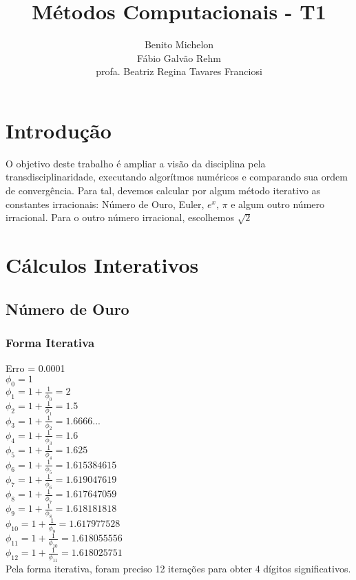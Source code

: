 \documentclass[11pt]{article}
\author{
	Benito Michelon \\
	Fábio Galvão Rehm \\
	profa. Beatriz Regina Tavares Franciosi \\
}
\title {Métodos Computacionais - T1}
\begin{document}
\maketitle
\newpage

\section{Introdução}
O objetivo deste trabalho é ampliar a visão da disciplina pela transdisciplinaridade, executando algorítmos numéricos e comparando sua
ordem de convergência. Para tal, devemos calcular por algum método iterativo as constantes irracionais: Número de Ouro, Euler, $e^x$, $\pi$ e algum outro número irracional. Para o outro número irracional, escolhemos $\sqrt{2}$
\section{Cálculos Interativos}
\subsection{Número de Ouro}
\subsubsection{Forma Iterativa}
Erro = 0.0001 \\
$\phi_{0} = 1$ \\
$\phi_{1} = 1 + \frac{1}{\phi_{0}} = 2$ \\
$\phi_{2} = 1 + \frac{1}{\phi_{1}} = 1.5$ \\
$\phi_{3} = 1 + \frac{1}{\phi_{2}} = 1.6666...$ \\
$\phi_{4} = 1 + \frac{1}{\phi_{3}} = 1.6$ \\
$\phi_{5} = 1 + \frac{1}{\phi_{4}} = 1.625$ \\
$\phi_{6} = 1 + \frac{1}{\phi_{5}} = 1.615384615$ \\
$\phi_{7} = 1 + \frac{1}{\phi_{6}} = 1.619047619$ \\
$\phi_{8} = 1 + \frac{1}{\phi_{7}} = 1.617647059$ \\
$\phi_{9} = 1 + \frac{1}{\phi_{8}} = 1.618181818$ \\
$\phi_{10} = 1 + \frac{1}{\phi_{9}} = 1.617977528$ \\
$\phi_{11} = 1 + \frac{1}{\phi_{10}} = 1.618055556$ \\
$\phi_{12} = 1 + \frac{1}{\phi_{11}} = 1.618025751$ \\

Pela forma iterativa, foram preciso 12 iterações para obter 4 dígitos significativos. \\
\end{document}

